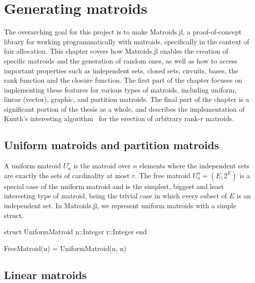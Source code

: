 \chapter{Generating matroids}
\label{chap:generating_matroids}
The overarching goal for this project is to make Matroids.jl, a proof-of-concept library for working programmatically with matroids, specifically in the context of fair allocation. This chapter covers how Matroids.jl enables the creation of specific matroids and the generation of random ones, as well as how to access important properties such as independent sets, closed sets, circuits, bases, the rank function and the closure function. The first part of the chapter focuses on implementing these features for various types of matroids, including uniform, linear (vector), graphic, and partition matroids. The final part of the chapter is a significant portion of the thesis as a whole, and describes the implementation of Knuth's interesting algorithm~\cite{knuth-1975} for the erection of arbitrary rank-$r$ matroids.


\section{Uniform matroids and partition matroids}
A uniform matroid $U_n^r$ is the matroid over $n$ elements where the independent sets are exactly the sets of cardinality at most $r$. The free matroid $U_n^n = (E, 2^E)$ is a special case of the uniform matroid and is the simplest, biggest and least interesting type of matroid, being the trivial case in which every subset of $E$ is an independent set. In Matroids.jl, we represent uniform matroids with a simple struct.

\begin{jllisting}
struct UniformMatroid
  n::Integer
  r::Integer
end

FreeMatroid(n) = UniformMatroid(n, n)
\end{jllisting}


\section{Linear matroids}

